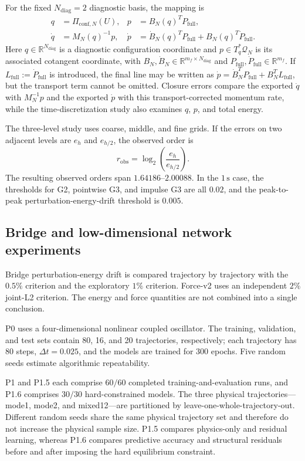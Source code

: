 For the fixed \(N_{\mathrm{diag}}=2\) diagnostic basis, the mapping is
\begin{align}
q &= \Pi_{\mathrm{conf},N}(U), &
p &= B_N(q)^{T}P_{\mathrm{full}}, \\
\dot q &= M_N(q)^{-1}p, &
\dot p &= \dot B_N(q)^{T}P_{\mathrm{full}}+B_N(q)^{T}\dot P_{\mathrm{full}} .
\end{align}
Here \(q\in\mathbb{R}^{N_{\mathrm{diag}}}\) is a diagnostic configuration coordinate and \(p\in T_q^*\mathcal{Q}_{N}\) is its associated cotangent coordinate, with \(B_N,\dot B_N\in\mathbb{R}^{m_f\times N_{\mathrm{diag}}}\) and \(P_{\mathrm{full}},\dot P_{\mathrm{full}}\in\mathbb{R}^{m_f}\). If \(L_{\mathrm{full}}:=\dot P_{\mathrm{full}}\) is introduced, the final line may be written as \(\dot p=\dot B_N^{T}P_{\mathrm{full}}+B_N^{T}L_{\mathrm{full}}\), but the transport term cannot be omitted. Closure errors compare the exported \(\dot q\) with \(M_N^{-1}p\) and the exported \(\dot p\) with this transport-corrected momentum rate, while the time-discretization study also examines \(q\), \(p\), and total energy.

The three-level study uses coarse, middle, and fine grids. If the errors on two adjacent levels are \(e_h\) and \(e_{h/2}\), the observed order is
\[
r_{\mathrm{obs}}=\log_2\!\left(\frac{e_h}{e_{h/2}}\right).
\]
The resulting observed orders span \(1.64186\)--\(2.00088\). In the \(1\,\mathrm{s}\) case, the thresholds for G2, pointwise G3, and impulse G3 are all \(0.02\), and the peak-to-peak perturbation-energy-drift threshold is \(0.005\).

\subsection{Bridge and low-dimensional network experiments}

Bridge perturbation-energy drift is compared trajectory by trajectory with the \(0.5\%\) criterion and the exploratory \(1\%\) criterion. Force-v2 uses an independent \(2\%\) joint-L2 criterion. The energy and force quantities are not combined into a single conclusion.

P0 uses a four-dimensional nonlinear coupled oscillator. The training, validation, and test sets contain 80, 16, and 20 trajectories, respectively; each trajectory has 80 steps, \(\Delta t=0.025\), and the models are trained for 300 epochs. Five random seeds estimate algorithmic repeatability.

P1 and P1.5 each comprise \(60/60\) completed training-and-evaluation runs, and P1.6 comprises \(30/30\) hard-constrained models. The three physical trajectories---mode1, mode2, and mixed12---are partitioned by leave-one-whole-trajectory-out. Different random seeds share the same physical trajectory set and therefore do not increase the physical sample size. P1.5 compares physics-only and residual learning, whereas P1.6 compares predictive accuracy and structural residuals before and after imposing the hard equilibrium constraint.

